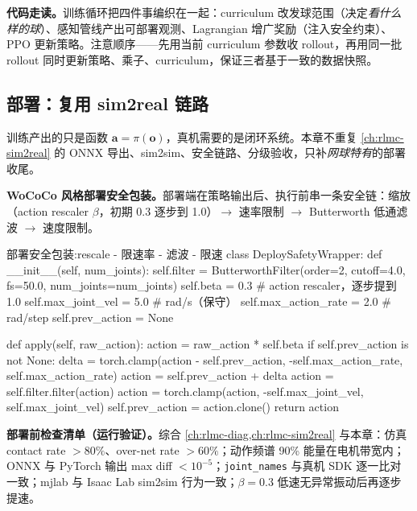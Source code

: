 \textbf{代码走读。}训练循环把四件事编织在一起：curriculum 改发球范围（决定\emph{看什么样的球}）、感知管线产出可部署观测、Lagrangian 增广奖励（注入安全约束）、PPO 更新策略。注意顺序——先用当前 curriculum 参数收 rollout，再用同一批 rollout 同时更新策略、乘子、curriculum，保证三者基于一致的数据快照。

\subsection{部署：复用 sim2real 链路}

训练产出的只是函数 $\mathbf{a}=\pi(\mathbf{o})$，真机需要的是闭环系统。本章不重复 \cref{ch:rlmc-sim2real} 的 ONNX 导出、sim2sim、安全链路、分级验收，只补\emph{网球特有}的部署收尾。

\textbf{WoCoCo 风格部署安全包装。}部署端在策略输出后、执行前串一条安全链：缩放（action rescaler $\beta$，初期 0.3 逐步到 1.0）$\to$ 速率限制 $\to$ Butterworth 低通滤波 $\to$ 速度限制。

\begin{codebox}[Python]{部署安全包装:rescale - 限速率 - 滤波 - 限速}
class DeploySafetyWrapper:
    def __init__(self, num_joints):
        self.filter = ButterworthFilter(order=2, cutoff=4.0, fs=50.0,
                                        num_joints=num_joints)
        self.beta = 0.3                 # action rescaler，逐步提到 1.0
        self.max_joint_vel = 5.0        # rad/s（保守）
        self.max_action_rate = 2.0      # rad/step
        self.prev_action = None

    def apply(self, raw_action):
        action = raw_action * self.beta
        if self.prev_action is not None:
            delta = torch.clamp(action - self.prev_action,
                                -self.max_action_rate, self.max_action_rate)
            action = self.prev_action + delta
        action = self.filter.filter(action)
        action = torch.clamp(action, -self.max_joint_vel, self.max_joint_vel)
        self.prev_action = action.clone()
        return action
\end{codebox}

\textbf{部署前检查清单（运行验证）。}综合 \cref{ch:rlmc-diag,ch:rlmc-sim2real} 与本章：仿真 contact rate $>80\%$、over-net rate $>60\%$；动作频谱 90\% 能量在电机带宽内；ONNX 与 PyTorch 输出 max diff $<10^{-5}$；\verb|joint_names| 与真机 SDK 逐一比对一致；mjlab 与 Isaac Lab sim2sim 行为一致；$\beta=0.3$ 低速无异常振动后再逐步提速。

